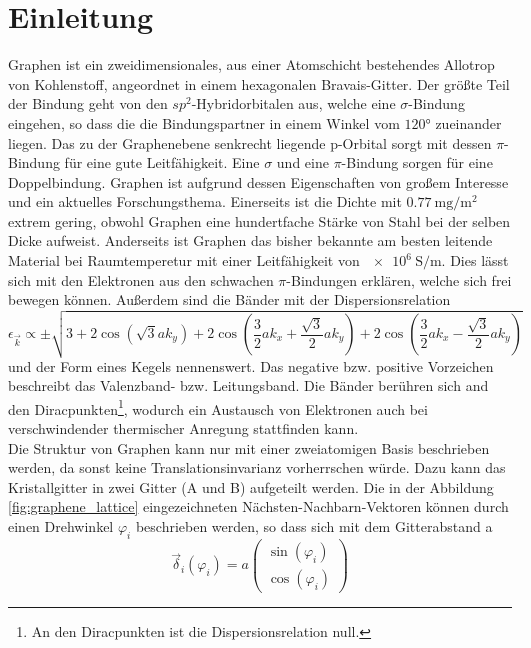 \chapter{Einleitung}
Graphen ist ein zweidimensionales, aus einer Atomschicht bestehendes Allotrop von Kohlenstoff, angeordnet in einem hexagonalen
Bravais-Gitter. 
Der größte Teil der Bindung geht von den $sp^2$-Hybridorbitalen aus, welche eine $\sigma$-Bindung eingehen, so dass 
die die Bindungspartner in einem Winkel vom $\ang{120;;}$ zueinander liegen. 
Das zu der Graphenebene senkrecht liegende p-Orbital sorgt mit dessen $\pi$-Bindung für eine gute Leitfähigkeit.\cite{graphene_properties}
Eine $\sigma$ und eine $\pi$-Bindung sorgen für eine Doppelbindung.
Graphen ist aufgrund dessen Eigenschaften von großem Interesse und ein aktuelles Forschungsthema.
Einerseits ist die  Dichte mit $\qty{0.77}{\milli\gram\per\metre\squared}$ extrem gering, obwohl 
Graphen eine hundertfache Stärke von Stahl bei der selben Dicke aufweist.\cite{graphene_properties} 
Anderseits ist Graphen das bisher bekannte am besten leitende Material bei Raumtemperetur mit einer Leitfähigkeit von 
$\qty{e6}{\siemens\per\metre}$\cite{graphene_properties}. 
Dies lässt sich mit den Elektronen aus den schwachen $\pi$-Bindungen erklären, welche sich frei bewegen können.
Außerdem sind die Bänder mit der Dispersionsrelation
\begin{equation*}
    \epsilon_{\vec{k}} \propto \pm \sqrt{3+2\cos(\sqrt{3}ak_y)+2\cos(\frac{3}{2}ak_x+\frac{\sqrt{3}}{2}ak_y) + 2\cos(\frac{3}{2}ak_x-\frac{\sqrt{3}}{2}ak_y) }
\end{equation*}
und der Form eines Kegels nennenswert.
Das negative bzw. positive Vorzeichen beschreibt das Valenzband- bzw. Leitungsband. 
Die Bänder berühren sich and den Diracpunkten\footnote{An den Diracpunkten ist die Dispersionsrelation null.}, wodurch ein Austausch von Elektronen auch bei verschwindender thermischer Anregung 
stattfinden kann.\cite{graphene_properties}\\
Die Struktur von Graphen kann nur mit einer zweiatomigen Basis beschrieben werden, da sonst keine Translationsinvarianz vorherrschen würde.
Dazu kann das Kristallgitter in zwei Gitter (A und B) aufgeteilt werden.
Die in der Abbildung \ref{fig:graphene_lattice} eingezeichneten Nächsten-Nachbarn-Vektoren können durch einen Drehwinkel $\varphi_i$ beschrieben werden, so dass sich 
mit dem Gitterabstand a
\begin{equation*}
    \vec{\delta}_i(\varphi_i) = a\begin{pmatrix} \sin (\varphi_i) \\ \cos (\varphi_i)     \end{pmatrix}
\end{equation*}
